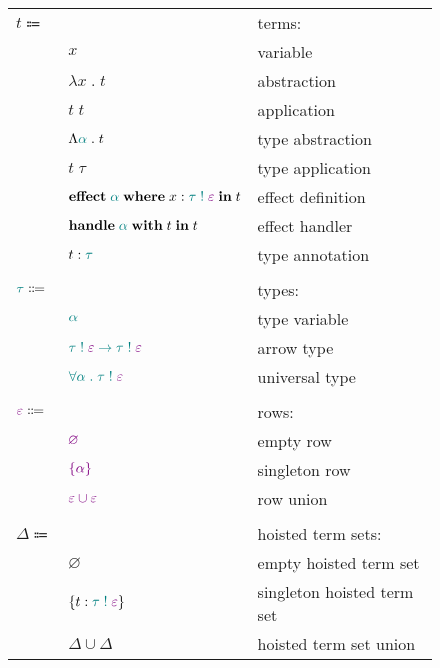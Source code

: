 \documentclass[12pt]{article}
\newcommand\anno[2]{#1 : \colorType{#2}}
\newcommand\term{t}
\newcommand\eVar{x}
\newcommand\eAbs[2]{\lambda #1 \; . \; #2}
\newcommand\eApp[2]{#1 \; #2}
\newcommand\eTAbs[2]{\Lambda \colorType{#1} \; . \; #2}
\newcommand\eTApp[2]{#1 \; #2}
\newcommand\eHandle[3]{\textbf{handle} \; \colorType{#1} \; \textbf{with} \; #2 \; \textbf{in} \; #3}
\newcommand\eEffect[5]{\textbf{effect} \; \colorType{#1} \; \textbf{where} \; \anno{#2}{\tEmbellished{#3}{#4}} \; \textbf{in} \; #5}
\newcommand\eAnno[2]{\anno{#1}{#2}}
\newcommand\colorType[1]{\textcolor{teal}{#1}}
\newcommand\type{\tau}
\newcommand\tVar{\alpha}
\newcommand\tArrow[4]{\tEmbellished{#1}{#2} \rightarrow \tEmbellished{#3}{#4}}
\newcommand\tForall[3]{\forall #1 \; . \; \tEmbellished{#2}{#3}}
\newcommand\tEmbellished[2]{#1 \; ! \; \colorRow{#2}}
\newcommand\colorRow[1]{\textcolor{violet}{#1}}
\newcommand\row{\varepsilon}
\newcommand\rEmpty{\varnothing}
\newcommand\rSingleton[1]{\left\{ #1 \right\}}
\newcommand\rUnion[2]{#1 \cup #2}
\newcommand\hoistedSet{\Delta}
\newcommand\hSingleton[3]{\left\{ \anno{#1}{\tEmbellished{#2}{#3}} \right\}}
\newcommand\hEmpty{\varnothing}
\newcommand\hUnion[2]{#1 \cup #2}
\begin{document}
        \begin{figure}[H]
          \begin{mdframed}[backgroundcolor=none]
            \begin{center}
              \begin{tabular}{l l l}
                $\term \Coloneqq$ & & terms: \\
                & $\eVar$ & variable \\
                & $\eAbs{\eVar}{\term}$ & abstraction \\
                & $\eApp{\term}{\term}$ & application \\
                & $\eTAbs{\tVar}{\term}$ & type abstraction \\
                & $\eTApp{\term}{\type}$ & type application \\
                & $\eEffect{\tVar}{\eVar}{\type}{\row}{\term}$ & effect definition \\
                & $\eHandle{\tVar}{\term}{\term}$ & effect handler \\
                & $\eAnno{\term}{\type}$ & type annotation \\
                \\
                $\colorType{\type} \Coloneqq$ & & types: \\
                & $\colorType{\tVar}$ & type variable \\
                & $\colorType{\tArrow{\type}{\row}{\type}{\row}}$ & arrow type \\
                & $\colorType{\tForall{\tVar}{\type}{\row}}$ & universal type \\
                \\
                $\colorRow{\row} \Coloneqq$ & & rows: \\
                & $\colorRow{\rEmpty}$ & empty row \\
                & $\colorRow{\rSingleton{\tVar}}$ & singleton row \\
                & $\colorRow{\rUnion{\row}{\row}}$ & row union \\
                \\
                $\hoistedSet \Coloneqq$ & & hoisted term sets: \\
                & $\hEmpty$ & empty hoisted term set \\
                & $\hSingleton{\term}{\type}{\row}$ & singleton hoisted term set \\
                & $\hUnion{\hoistedSet}{\hoistedSet}$ & hoisted term set union \\

\end{tabular}
\end{center}
\end{mdframed}
\end{figure}
\end{document}
